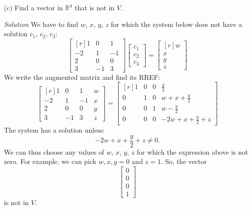 \documentclass[12pt]{article}
\begin{document}
\medskip
(c) Find a vector in $\mathbb{R}^4$ that is not in $V$.

\emph{Solution} We have to find $w$, $x$, $y$, $z$ for which the system below does not have a solution $c_1$, $c_2$, $c_3$:
\[
\left[\begin{matrix*}[r]1 & 0 & 1\\-2 & 1 & -1\\2 & 0 & 0\\3 & -1 & 3\end{matrix*}\right]
\begin{bmatrix}c_1\\c_2\\c_3\end{bmatrix}=
\left[\begin{matrix*}[r]w\\x\\y\\z\end{matrix*}\right]
\]
We write the augmented matrix and find its RREF:
\[
\left[\begin{matrix*}[r]1 & 0 & 1 & w\\-2 & 1 & -1 & x\\2 & 0 & 0 & y\\3 & -1 & 3 & z\end{matrix*}\right]=
\left[\begin{matrix*}[r]1 & 0 & 0 & \frac{y}{2}\\
0 & 1 & 0 &  w + x + \frac{y}{2}\\
0 & 0 & 1 &  w - \frac{y}{2}\\
0 & 0 & 0 & - 2 w + x + \frac{y}{2} + z\end{matrix*}\right]
\]
The system has a solution unless:
\[
- 2 w + x + \frac{y}{2} + z\ne 0.
\]
We can thus choose any values of $w$, $x$, $y$, $z$ for which the expression above is not zero. For example, we can pick $w,x,y=0$ and $z=1$. So, the vector
\[
\begin{bmatrix}0\\0\\0\\1\end{bmatrix}
\]
is not in $V$.
\proofend
\end{document}

